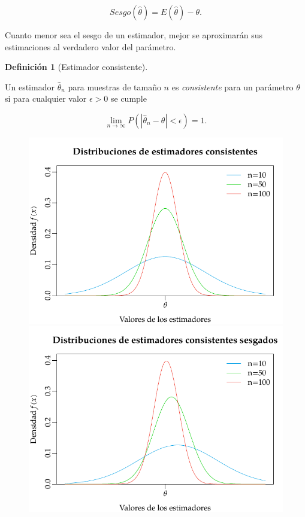 \documentclass[
  a4paper,
]{scrreport}
\theoremstyle{plain}
\theoremstyle{definition}
\newtheorem{definition}{Definición}[chapter]
\theoremstyle{definition}
\theoremstyle{remark}
\begin{document}
\[
Sesgo(\hat \theta) = E(\hat \theta)-\theta.
\]

Cuanto menor sea el sesgo de un estimador, mejor se aproximarán sus
estimaciones al verdadero valor del parámetro.

\begin{definition}[Estimador
consistente]\protect\hypertarget{def-estimador-consistente}{}\label{def-estimador-consistente}

Un estimador \(\hat \theta_n\) para muestras de tamaño \(n\) es
\emph{consistente} para un parámetro \(\theta\) si para cualquier valor
\(\epsilon>0\) se cumple

\[
\lim_{n\rightarrow \infty} P(|\hat \theta_n-\theta|<\epsilon)=1.
\]

\end{definition}

\begin{figure}

\begin{minipage}{0.50\linewidth}

\includegraphics{img/estimacion/estimadores-consistentes.pdf}

\end{minipage}%
%
\begin{minipage}{0.50\linewidth}

\includegraphics{img/estimacion/estimadores-consistentes-sesgados.pdf}


\end{minipage}
\end{figure}
\end{document}
